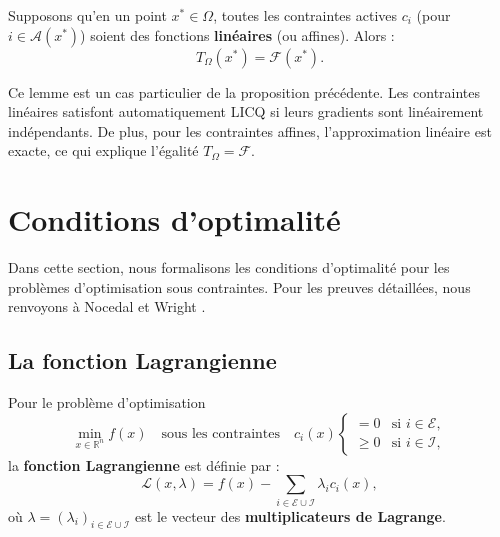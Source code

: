 \begin{lemme}
    Supposons qu'en un point $x^* \in \Omega$, toutes les contraintes actives $c_i$ (pour $i \in \mathcal{A}(x^*)$) soient des fonctions \textbf{linéaires} (ou affines). Alors :
    \begin{equation}
        T_\Omega(x^*) = \mathcal{F}(x^*).
    \end{equation}
\end{lemme}

\begin{remarque}
    Ce lemme est un cas particulier de la proposition précédente. Les contraintes linéaires satisfont automatiquement LICQ si leurs gradients sont linéairement indépendants. De plus, pour les contraintes affines, l'approximation linéaire est exacte, ce qui explique l'égalité $T_\Omega = \mathcal{F}$.
\end{remarque}

\section{Conditions d'optimalité}

Dans cette section, nous formalisons les conditions d'optimalité pour les problèmes d'optimisation sous contraintes. Pour les preuves détaillées, nous renvoyons à Nocedal et Wright \cite{nocedal2006numerical}.

\subsection{La fonction Lagrangienne}

\begin{definition}
    Pour le problème d'optimisation
    \begin{equation}
        \min_{x \in \mathbb{R}^n} f(x) \quad \text{sous les contraintes} \quad c_i(x) \begin{cases} = 0 & \text{si } i \in \mathcal{E}, \\ \geq 0 & \text{si } i \in \mathcal{I}, \end{cases}
    \end{equation}
    la \textbf{fonction Lagrangienne} est définie par :
    \begin{equation}
        \mathcal{L}(x, \lambda) = f(x) - \sum_{i \in \mathcal{E} \cup \mathcal{I}} \lambda_i c_i(x),
    \end{equation}
    où $\lambda = (\lambda_i)_{i \in \mathcal{E} \cup \mathcal{I}}$ est le vecteur des \textbf{multiplicateurs de Lagrange}.
\end{definition}


